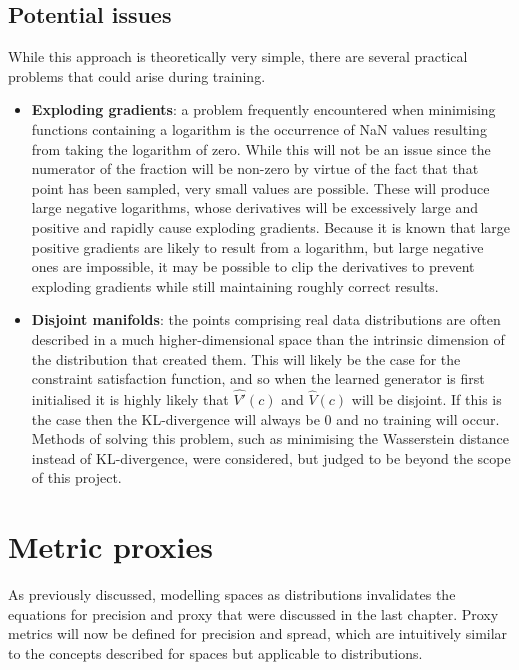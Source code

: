 \documentclass[../../main.tex]{subfiles}
\begin{document}
\subsection{Potential issues} \label{subsection:potentialIssues}

While this approach is theoretically very simple, there are several practical problems that could arise during training.
\begin{itemize}
    \item[] \textbf{Exploding gradients}: a problem frequently encountered when minimising functions containing a logarithm is the occurrence of NaN values resulting from taking the logarithm of zero.
    While this will not be an issue since the numerator of the fraction will be non-zero by virtue of the fact that that point has been sampled, very small values are possible.
    These will produce large negative logarithms, whose derivatives will be excessively large and positive and rapidly cause exploding gradients.
    Because it is known that large positive gradients are likely to result from a logarithm, but large negative ones are impossible, it may be possible to clip the derivatives to prevent exploding gradients while still maintaining roughly correct results.   
    \item[] \textbf{Disjoint manifolds}: the points comprising real data distributions are often described in a much higher-dimensional space than the intrinsic dimension of the distribution that created them.
    This will likely be the case for the constraint satisfaction function, and so when the learned generator is first initialised it is highly likely that $\hat{V'}(c)$ and $\hat{V}(c)$ will be disjoint.
    If this is the case then the KL-divergence will always be 0 and no training will occur.
    Methods of solving this problem, such as minimising the Wasserstein distance instead of KL-divergence, were considered, but judged to be beyond the scope of this project.
  \end{itemize}

\section{Metric proxies} \label{section:metricProxies}

As previously discussed, modelling spaces as distributions invalidates the equations for precision and proxy that were discussed in the last chapter.
Proxy metrics will now be defined for precision and spread, which are intuitively similar to the concepts described for spaces but applicable to distributions.
\end{document}
